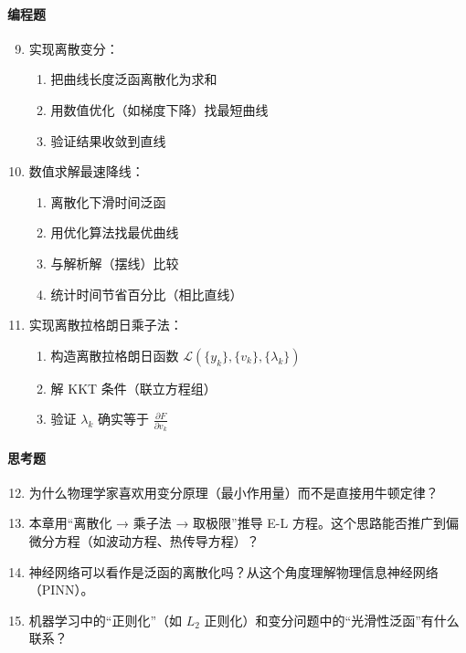 \paragraph{编程题}
\begin{enumerate}
    \setcounter{enumi}{8}
    \item 实现离散变分：
    \begin{enumerate}
        \item 把曲线长度泛函离散化为求和
        \item 用数值优化（如梯度下降）找最短曲线
        \item 验证结果收敛到直线
    \end{enumerate}
    
    \item 数值求解最速降线：
    \begin{enumerate}
        \item 离散化下滑时间泛函
        \item 用优化算法找最优曲线
        \item 与解析解（摆线）比较
        \item 统计时间节省百分比（相比直线）
    \end{enumerate}
    
    \item 实现离散拉格朗日乘子法：
    \begin{enumerate}
        \item 构造离散拉格朗日函数 $\mathcal{L}(\{y_k\}, \{v_k\}, \{\lambda_k\})$
        \item 解 KKT 条件（联立方程组）
        \item 验证 $\lambda_k$ 确实等于 $\frac{\partial F}{\partial v_k}$
    \end{enumerate}
\end{enumerate}

\paragraph{思考题}
\begin{enumerate}
    \setcounter{enumi}{11}
    \item 为什么物理学家喜欢用变分原理（最小作用量）而不是直接用牛顿定律？
    
    \item 本章用“离散化 → 乘子法 → 取极限”推导 E-L 方程。这个思路能否推广到偏微分方程（如波动方程、热传导方程）？
    
    \item 神经网络可以看作是泛函的离散化吗？从这个角度理解物理信息神经网络（PINN）。
    
    \item 机器学习中的“正则化”（如 $L_2$ 正则化）和变分问题中的“光滑性泛函”有什么联系？
\end{enumerate}
